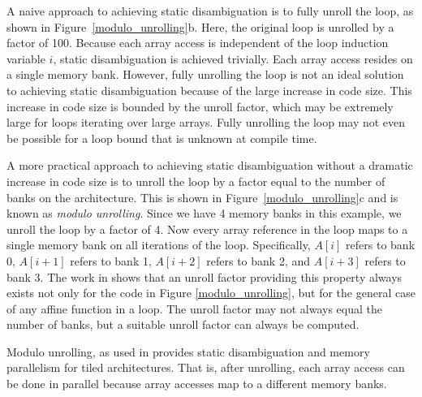 A naive approach to achieving static disambiguation is to fully unroll the loop, as shown in Figure~\ref{modulo_unrolling}b. Here, the original loop is unrolled by a factor of 100. Because each array access is independent of the loop induction variable $i$, static disambiguation is achieved trivially. Each array access resides on a single memory bank. However, fully unrolling the loop is not an ideal solution to achieving static disambiguation because of the large increase in code size. This increase in code size is bounded by the unroll factor, which may be extremely large for loops iterating over large arrays. Fully unrolling the loop may not even be possible for a loop bound that is unknown at compile time. 

A more practical approach to achieving static disambiguation without a dramatic increase in code size is to unroll the loop by a factor equal to the number of banks on the architecture. This is shown in Figure~\ref{modulo_unrolling}c and is known as \textit{modulo unrolling}. Since we have 4 memory banks in this example, we unroll the loop by a factor of 4. Now every array reference in the loop maps to a single memory bank on all iterations of the loop. Specifically, $A[i]$ refers to bank 0, $A[i+1]$ refers to bank 1, $A[i+2]$ refers to bank 2, and $A[i+3]$ refers to bank 3. The work in \cite{barua1999maps} shows that an unroll factor providing this property always exists not only for the code in Figure \ref{modulo_unrolling}, but for the general case of any affine function in a loop.  The unroll factor may not always equal the number of banks, but a suitable unroll factor can always be computed.

Modulo unrolling, as used in \cite{barua1999maps} provides static disambiguation and memory parallelism for tiled architectures. That is, after unrolling, each array access can be done in parallel because array accesses map to a different memory banks. 